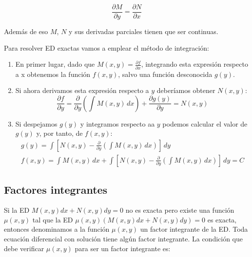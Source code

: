 \documentclass[a4paper,12pt,titlepage]{article}
\begin{document}
\begin{equation*}
    \frac{\partial M}{\partial y} = \frac{\partial N}{\partial x}
\end{equation*}

Además de eso $M$, $N$ y sus derivadas parciales tienen que ser continuas.

\par Para resolver ED exactas vamos a emplear el método de integración:

\newpage

\begin{enumerate}
    \item En primer lugar, dado que $M(x,y)=\frac{\partial f}{\partial x}$, integrando esta expresión respecto a x obtenemos la función $f(x,y)$, salvo una función desconocida $g(y)$.
    \item Si ahora derivamos esta expresión respecto a $y$ deberíamos obtener $N(x,y)$:
    \begin{equation*}
        \frac{\partial f}{\partial y} = \frac{\partial}{\partial y} \left (\int M(x,y)\,dx\right ) + \frac{\partial g(y)}{\partial y} = N(x,y)
    \end{equation*}
    \item Si despejamos $g(y)$ y integramos respecto aa $y$ podemos calcular el valor de $g(y)$ y, por tanto, de $f(x,y)$:
    \begin{equation*}
        \begin{gathered}
        g(y) = \int \left [N(x,y)- \frac{\partial}{\partial y}\left (\int M(x,y)\,dx \right )\right ]\,dy \\
        f(x,y) = \int M(x,y)\, dx + \int \left [N(x,y)- \frac{\partial}{\partial y}\left (\int M(x,y)\,dx \right )\right ]\,dy = C
        \end{gathered}
    \end{equation*}
\end{enumerate}

\subsection{Factores integrantes}

Si la ED $M(x,y)dx+ N(x,y)dy=0$ no es exacta pero existe una función $\mu(x,y)$ tal que la ED $\mu(x,y)\left (M(x,y)dx+ N(x,y)dy\right )=0$ es exacta, entonces denominamos a la función $\mu(x,y)$ un factor integrante de la ED. Toda ecuación diferencial con solución tiene algún factor integrante. La condición que debe verificar $\mu(x,y)$ para ser un factor integrante es:
\end{document}
